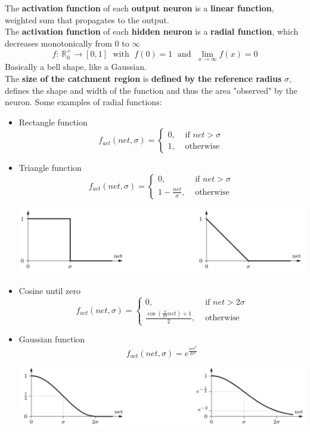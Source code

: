 The \textbf{activation function} of each \textbf{output neuron} is a \textbf{linear function}, weighted sum that propagates to the output.\\
The \textbf{activation function} of each \textbf{hidden neuron} is a \textbf{radial function}, which decreases monotonically from $0$ to $\infty$
$$ f: \, \mathbb{R}_0^+ \rightarrow [0,1] \; \text{ with } \; f(0) = 1 \; \text{ and } \; \lim_{x \rightarrow \infty} f(x) = 0 $$ 
Basically a bell shape, like a Gaussian.\\
The \textbf{size of the catchment region} is \textbf{defined by the reference radius} $\sigma$, defines the shape and width of the function and thus the area "observed" by the neuron. Some examples of radial functions:
\begin{itemize}
	\item Rectangle function
	$$f_{act} (net, \sigma) = \begin{cases}
		0, & \text{ if } net > \sigma \\
		1, & \text{ otherwise }
	\end{cases} $$
	
	\item Triangle function
	$$f_{act} (net, \sigma) = \begin{cases}
		0, & \text{ if } net > \sigma \\
		1 - \frac{net}{\sigma}, & \text{ otherwise }
	\end{cases} $$
	\begin{center}
		\includegraphics[width=0.95\columnwidth]{img/NN/radial1}
	\end{center}
	
	\newpage
	
	\item Cosine until zero
	$$f_{act} (net, \sigma) = \begin{cases}
		0, & \text{ if } net > 2\sigma \\
		\frac{\cos \left(\frac{\pi}{2 \sigma} net\right) + 1}{2}, & \text{ otherwise }
	\end{cases} $$
	
	\item Gaussian function
	$$f_{act} (net, \sigma) = e^{\frac{net^2}{2 \sigma^2}} $$
	\begin{center}
		\includegraphics[width=0.95\columnwidth]{img/NN/radial2}
	\end{center}
\end{itemize}

